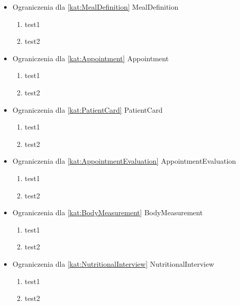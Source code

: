 \begin{itemize}[label={}]
\begin{enumerate}[label={\textbf{OGR/\protect\threedigits{\arabic{enumi}}}}, wide, labelwidth=!, resume]
    \end{enumerate}
    \item Ograniczenia dla \ref{kat:MealDefinition} MealDefinition
    \begin{enumerate}[label={\textbf{OGR/\protect\threedigits{\arabic{enumi}}}}, wide, labelwidth=!, resume]
        \item test1
        \item test2
    \end{enumerate}
    \item Ograniczenia dla \ref{kat:Appointment} Appointment
    \begin{enumerate}[label={\textbf{OGR/\protect\threedigits{\arabic{enumi}}}}, wide, labelwidth=!, resume]
        \item test1
        \item test2
    \end{enumerate}
    \item Ograniczenia dla \ref{kat:PatientCard} PatientCard
    \begin{enumerate}[label={\textbf{OGR/\protect\threedigits{\arabic{enumi}}}}, wide, labelwidth=!, resume]
        \item test1
        \item test2
    \end{enumerate}
    \item Ograniczenia dla \ref{kat:AppointmentEvaluation} AppointmentEvaluation
    \begin{enumerate}[label={\textbf{OGR/\protect\threedigits{\arabic{enumi}}}}, wide, labelwidth=!, resume]
        \item test1
        \item test2
    \end{enumerate}
    \item Ograniczenia dla \ref{kat:BodyMeasurement} BodyMeasurement
    \begin{enumerate}[label={\textbf{OGR/\protect\threedigits{\arabic{enumi}}}}, wide, labelwidth=!, resume]
        \item test1
        \item test2
    \end{enumerate}
    \item Ograniczenia dla \ref{kat:NutritionalInterview} NutritionalInterview
    \begin{enumerate}[label={\textbf{OGR/\protect\threedigits{\arabic{enumi}}}}, wide, labelwidth=!, resume]
        \item test1
        \item test2

\end{enumerate}
\end{itemize}
